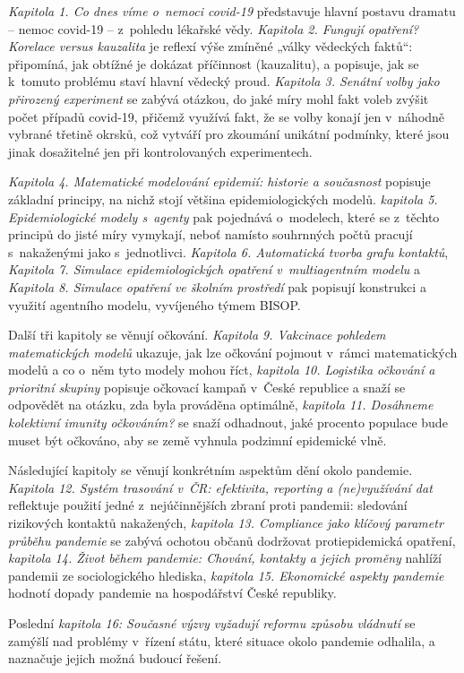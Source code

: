 {\em Kapitola 1. Co dnes víme o~nemoci covid-19} představuje hlavní postavu dramatu -- nemoc covid-19 -- z~pohledu lékařské vědy.
{\em Kapitola 2. Fungují opatření? Korelace versus kauzalita} je reflexí výše zmíněné „války vědeckých faktů“: připomíná, jak obtížné je dokázat příčinnost (kauzalitu), a popisuje, jak se k~tomuto problému staví hlavní vědecký proud. {\em Kapitola 3. Senátní volby jako přirozený experiment} se zabývá otázkou, do jaké míry mohl fakt voleb zvýšit počet případů covid-19, přičemž využívá fakt, že se volby konají jen v~náhodně vybrané třetině okrsků, což vytváří pro zkoumání unikátní podmínky, které jsou jinak dosažitelné jen při kontrolovaných experimentech.

{\em Kapitola 4. Matematické modelování epidemií: historie a současnost} popisuje základní principy, na nichž stojí většina epidemiologických modelů.
{\em kapitola 5. Epidemiologické modely s~agenty} pak pojednává o~modelech, které se z~těchto principů do jisté míry vymykají, neboť namísto souhrnných počtů pracují s~nakaženými jako s~jednotlivci. {\em Kapitola 6. Automatická tvorba grafu kontaktů}, {\em Kapitola 7. Simulace epidemiologických opatření v~multiagentním modelu} a {\em Kapitola 8. Simulace opatření ve školním prostředí} pak popisují konstrukci a využití agentního modelu, vyvíjeného týmem BISOP.

Další tři kapitoly se věnují očkování. {\em Kapitola 9. Vakcinace pohledem matematických modelů} ukazuje, jak lze očkování pojmout v~rámci matematických modelů a co o~něm tyto modely mohou říct, {\em kapitola 10. Logistika očkování a prioritní skupiny} popisuje očkovací kampaň v~České republice a snaží se odpovědět na otázku, zda byla prováděna optimálně, {\em kapitola 11. Dosáhneme kolektivní imunity očkováním?} se snaží odhadnout, jaké procento populace bude muset být očkováno, aby se země vyhnula podzimní epidemické vlně.

Následující kapitoly se věnují konkrétním aspektům dění okolo pandemie. 
{\em Kapitola 12. Systém trasování v~ČR: efektivita, reporting a (ne)využívání dat} reflektuje použití jedné z~nejúčinnějších zbraní proti pandemii: sledování rizikových kontaktů na\-ka\-že\-ných, {\em kapitola 13. Compliance jako klíčový parametr průběhu pandemie} se zabývá ochotou občanů dodržovat protiepidemická opatření, {\em kapitola 14. Život během pandemie: Chování, kontakty a jejich proměny} nahlíží pandemii ze sociologického hlediska, {\em kapitola 15. Ekonomické aspekty pandemie} hodnotí dopady pandemie na hospodářství České republiky.

Poslední {\em kapitola 16: Současné výzvy vyžadují reformu způsobu vládnutí} se zamýš\-lí nad problémy v~řízení státu, které situace okolo pandemie odhalila, a naznačuje jejich možná budoucí řešení.
